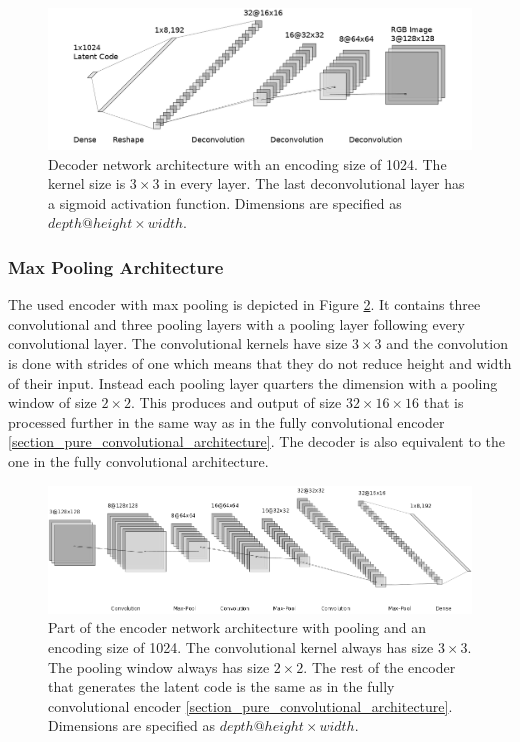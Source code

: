 \begin{figure}[h]
    \centering
    \includegraphics[width=\textwidth]{images/figures/decoder_neural_network.png}
    \caption{Decoder network architecture with an encoding size of 1024.
    The kernel size is $3\times 3$ in every layer. The last deconvolutional layer has a sigmoid activation
    function. Dimensions are specified as $depth@height\times width$.} \label{figure_decoder}
\end{figure}

\subsubsection{Max Pooling Architecture}

The used encoder with max pooling is depicted in Figure \ref{figure_encoder_pooling}. It contains three
convolutional and three pooling layers with a pooling layer following every convolutional layer. The convolutional
kernels have size $3\times3$ and the convolution is done with strides of one which means that they do not reduce
height and width of their input. Instead each pooling layer quarters the dimension with a pooling window of size
$2\times 2$. This produces and output of size $32\times16\times16$ that is processed further in the same way
as in the fully convolutional encoder \ref{section_pure_convolutional_architecture}.
The decoder is also equivalent to the one in the fully convolutional architecture.

\begin{figure}[h]
    \centering
    \includegraphics[width=\textwidth]{images/figures/encoder_pooling.png}
    \caption{Part of the encoder network architecture with pooling and an encoding size of 1024.
    The convolutional kernel always has size $3\times 3$. The pooling window always has size $2\times 2$.
    The rest of the encoder that generates the latent code is the same as in the fully convolutional encoder
    \ref{section_pure_convolutional_architecture}.
    Dimensions are specified as $depth@height\times width$.} \label{figure_encoder_pooling}
\end{figure}


